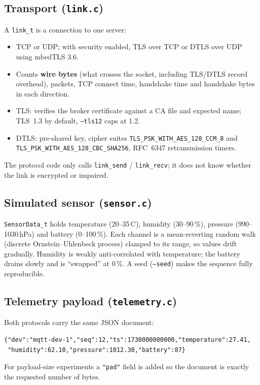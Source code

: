 \documentclass[11pt,a4paper]{article}
\newcommand{\code}[1]{\texttt{#1}}
\begin{document}
\subsection{Transport (\code{link.c})}
A \code{link\_t} is a connection to one server:
\begin{itemize}
  \item TCP or UDP; with security enabled, TLS over TCP or DTLS over UDP using
        mbedTLS 3.6.
  \item Counts \textbf{wire bytes} (what crosses the socket, including TLS/DTLS
        record overhead), packets, TCP connect time, handshake time and
        handshake bytes in each direction.
  \item TLS: verifies the broker certificate against a CA file and expected
        name; TLS~1.3 by default, \code{--tls12} caps at 1.2.
  \item DTLS: pre-shared key, cipher suites \code{TLS\_PSK\_WITH\_AES\_128\_CCM\_8}
        and \code{TLS\_PSK\_WITH\_AES\_128\_CBC\_SHA256}, RFC~6347 retransmission
        timers.
\end{itemize}
The protocol code only calls \code{link\_send} / \code{link\_recv}; it does not
know whether the link is encrypted or impaired.

\subsection{Simulated sensor (\code{sensor.c})}
\code{SensorData\_t} holds temperature (20--35\,\textdegree C), humidity
(30--90\,\%), pressure (990--1030\,hPa) and battery (0--100\,\%). Each channel is
a mean-reverting random walk (discrete Ornstein--Uhlenbeck process) clamped to
its range, so values drift gradually. Humidity is weakly anti-correlated with
temperature; the battery drains slowly and is ``swapped'' at 0\,\%. A seed
(\code{--seed}) makes the sequence fully reproducible.

\subsection{Telemetry payload (\code{telemetry.c})}
Both protocols carry the same JSON document:
\begin{lstlisting}
{"dev":"mqtt-dev-1","seq":12,"ts":1730000000000,"temperature":27.41,
 "humidity":62.10,"pressure":1012.30,"battery":87}
\end{lstlisting}
For payload-size experiments a \code{"pad"} field is added so the document is
exactly the requested number of bytes.
\end{document}
